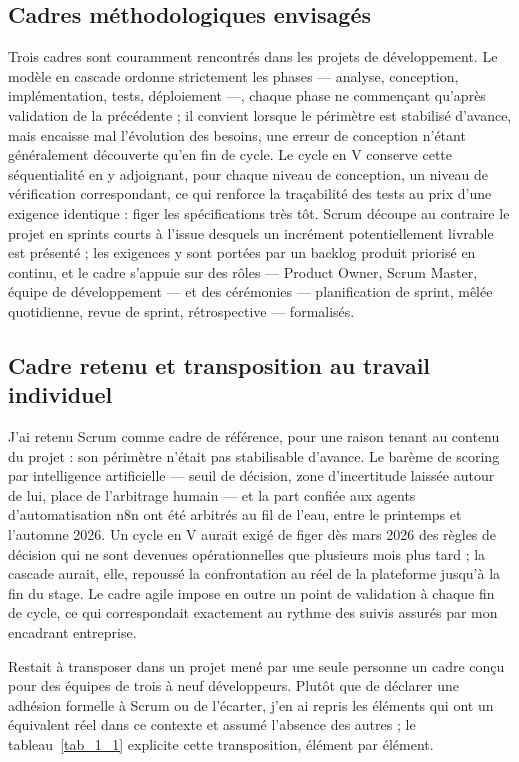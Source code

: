 \subsection{Cadres méthodologiques envisagés}
\label{sec_1_7_1}
Trois cadres sont couramment rencontrés dans les projets de développement. Le modèle en cascade ordonne strictement les phases — analyse, conception, implémentation, tests, déploiement —, chaque phase ne commençant qu’après validation de la précédente ; il convient lorsque le périmètre est stabilisé d’avance, mais encaisse mal l’évolution des besoins, une erreur de conception n’étant généralement découverte qu’en fin de cycle. Le cycle en V conserve cette séquentialité en y adjoignant, pour chaque niveau de conception, un niveau de vérification correspondant, ce qui renforce la traçabilité des tests au prix d’une exigence identique : figer les spécifications très tôt. Scrum \cite{ref02} découpe au contraire le projet en sprints courts à l’issue desquels un incrément potentiellement livrable est présenté ; les exigences y sont portées par un backlog produit priorisé en continu, et le cadre s’appuie sur des rôles — Product Owner, Scrum Master, équipe de développement — et des cérémonies — planification de sprint, mêlée quotidienne, revue de sprint, rétrospective — formalisés.

\subsection{Cadre retenu et transposition au travail individuel}
\label{sec_1_7_2}
J’ai retenu Scrum comme cadre de référence, pour une raison tenant au contenu du projet : son périmètre n’était pas stabilisable d’avance. Le barème de scoring par intelligence artificielle — seuil de décision, zone d’incertitude laissée autour de lui, place de l’arbitrage humain — et la part confiée aux agents d’automatisation n8n ont été arbitrés au fil de l’eau, entre le printemps et l’automne 2026. Un cycle en V aurait exigé de figer dès mars 2026 des règles de décision qui ne sont devenues opérationnelles que plusieurs mois plus tard ; la cascade aurait, elle, repoussé la confrontation au réel de la plateforme jusqu’à la fin du stage. Le cadre agile impose en outre un point de validation à chaque fin de cycle, ce qui correspondait exactement au rythme des suivis assurés par mon encadrant entreprise.

Restait à transposer dans un projet mené par une seule personne un cadre conçu pour des équipes de trois à neuf développeurs. Plutôt que de déclarer une adhésion formelle à Scrum ou de l’écarter, j’en ai repris les éléments qui ont un équivalent réel dans ce contexte et assumé l’absence des autres ; le tableau~\ref{tab_1_1} explicite cette transposition, élément par élément.

